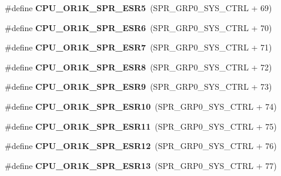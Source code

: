 \begin{DoxyCompactItemize}
\#define {\bfseries C\+P\+U\+\_\+\+O\+R1\+K\+\_\+\+S\+P\+R\+\_\+\+E\+S\+R5}~(S\+P\+R\+\_\+\+G\+R\+P0\+\_\+\+S\+Y\+S\+\_\+\+C\+T\+RL + 69)
\item 
\mbox{\label{or1k-utility_8h_a7a3756c38cfac733ed77b18b5032eef0}} 
\#define {\bfseries C\+P\+U\+\_\+\+O\+R1\+K\+\_\+\+S\+P\+R\+\_\+\+E\+S\+R6}~(S\+P\+R\+\_\+\+G\+R\+P0\+\_\+\+S\+Y\+S\+\_\+\+C\+T\+RL + 70)
\item 
\mbox{\label{or1k-utility_8h_a771f62b343689997bc7315f8c1d6061c}} 
\#define {\bfseries C\+P\+U\+\_\+\+O\+R1\+K\+\_\+\+S\+P\+R\+\_\+\+E\+S\+R7}~(S\+P\+R\+\_\+\+G\+R\+P0\+\_\+\+S\+Y\+S\+\_\+\+C\+T\+RL + 71)
\item 
\mbox{\label{or1k-utility_8h_a58d87c7d0934a72a19b5df1948af3d86}} 
\#define {\bfseries C\+P\+U\+\_\+\+O\+R1\+K\+\_\+\+S\+P\+R\+\_\+\+E\+S\+R8}~(S\+P\+R\+\_\+\+G\+R\+P0\+\_\+\+S\+Y\+S\+\_\+\+C\+T\+RL + 72)
\item 
\mbox{\label{or1k-utility_8h_af4a47a5452b59cde33794f47286d18dd}} 
\#define {\bfseries C\+P\+U\+\_\+\+O\+R1\+K\+\_\+\+S\+P\+R\+\_\+\+E\+S\+R9}~(S\+P\+R\+\_\+\+G\+R\+P0\+\_\+\+S\+Y\+S\+\_\+\+C\+T\+RL + 73)
\item 
\mbox{\label{or1k-utility_8h_afa48eb313eda72058442118d83aec583}} 
\#define {\bfseries C\+P\+U\+\_\+\+O\+R1\+K\+\_\+\+S\+P\+R\+\_\+\+E\+S\+R10}~(S\+P\+R\+\_\+\+G\+R\+P0\+\_\+\+S\+Y\+S\+\_\+\+C\+T\+RL + 74)
\item 
\mbox{\label{or1k-utility_8h_aff9994eb30080198ccd7e10acde6287e}} 
\#define {\bfseries C\+P\+U\+\_\+\+O\+R1\+K\+\_\+\+S\+P\+R\+\_\+\+E\+S\+R11}~(S\+P\+R\+\_\+\+G\+R\+P0\+\_\+\+S\+Y\+S\+\_\+\+C\+T\+RL + 75)
\item 
\mbox{\label{or1k-utility_8h_ad5517da4c3ec5c498be175c09baf9f5f}} 
\#define {\bfseries C\+P\+U\+\_\+\+O\+R1\+K\+\_\+\+S\+P\+R\+\_\+\+E\+S\+R12}~(S\+P\+R\+\_\+\+G\+R\+P0\+\_\+\+S\+Y\+S\+\_\+\+C\+T\+RL + 76)
\item 
\mbox{\label{or1k-utility_8h_a2ba17942614c5f4d1df11548b3fc21d3}} 
\#define {\bfseries C\+P\+U\+\_\+\+O\+R1\+K\+\_\+\+S\+P\+R\+\_\+\+E\+S\+R13}~(S\+P\+R\+\_\+\+G\+R\+P0\+\_\+\+S\+Y\+S\+\_\+\+C\+T\+RL + 77)

\end{DoxyCompactItemize}

